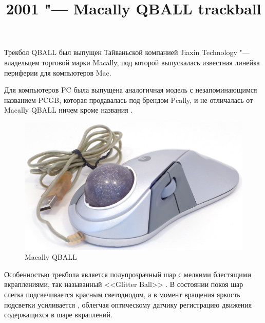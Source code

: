 \documentclass[11pt, a4paper]{article}
\begin{document}
\title{2001 "--- Macally QBALL trackball}
\date{}
\maketitle
{}
Трекбол QBALL был выпущен Тайваньской компанией Jiaxin Technology "--- владельцем торговой марки Macally, под которой выпускалась известная линейка периферии для компьютеров Mac.

Для компьютеров PC была выпущена аналогичная модель с незапоминающимся названием PCGB, которая продавалась под брендом Pcally, и не отличалась от Macally QBALL ничем кроме названия \cite{trackballfan}.

\begin{figure}[h]
    \centering
    \includegraphics[scale=0.5]{2001_macally_qball/pic_30.jpg}
    \caption{Macally QBALL}
    \label{fig:MacallyQBALLPic}
\end{figure}

Особенностью трекбола является полупрозрачный шар с мелкими блестящими вкраплениями, так называнный <<Glitter Ball>> \cite{site}. В состоянии покоя шар слегка подсвечивается красным светодиодом, а в момент вращения яркость подсветки усиливается \cite{review}, облегчая оптическому датчику регистрацию движения содержащихся в шаре вкраплений.
\end{document}
